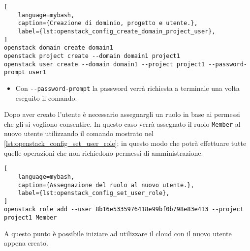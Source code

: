 \begin{lstlisting}[
    language=mybash, 
    caption={Creazione di dominio, progetto e utente.},
    label={lst:openstack_config_create_domain_project_user},
]
openstack domain create domain1
openstack project create --domain domain1 project1
openstack user create --domain domain1 --project project1 --password-prompt user1
\end{lstlisting}
\begin{itemize}
    \item Con \verb|--password-prompt| la password verrà richiesta a terminale una volta eseguito il comando.
\end{itemize}

\medskip\noindent
Dopo aver creato l'utente è necessario assegnargli un ruolo in base ai permessi che gli si vogliono consentire. In questo caso verrà assegnato il ruolo \verb|Member| al nuovo utente utilizzando il comando mostrato nel \cref{lst:openstack_config_set_user_role}; in questo modo che potrà effettuare tutte quelle operazioni che non richiedono permessi di amministrazione.

\begin{lstlisting}[
    language=mybash, 
    caption={Assegnazione del ruolo al nuovo utente.},
    label={lst:openstack_config_set_user_role},
]
openstack role add --user 8b16e5335976418e99bf0b798e83e413 --project project1 Member
\end{lstlisting}

\bigskip\noindent
A questo punto è possibile iniziare ad utilizzare il cloud con il nuovo utente appena creato. 
% 




